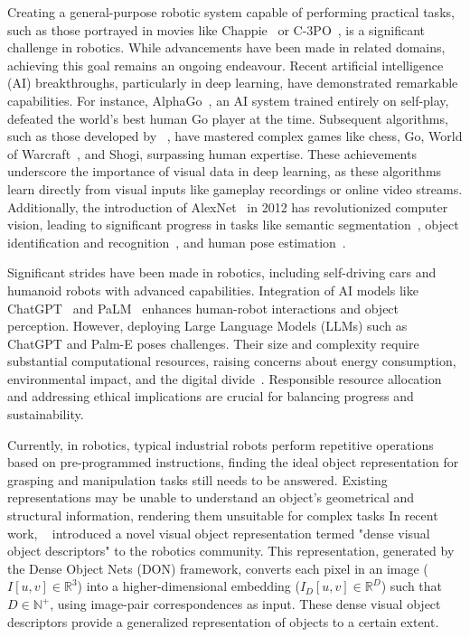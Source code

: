 Creating a general-purpose robotic system capable of performing practical tasks, such as those portrayed
in movies like Chappie~\cite{blomkamp2015chappie} or C-3PO~\cite{lucas1977star}, is a significant challenge in robotics.
While advancements have been made in related domains, achieving this goal remains an ongoing endeavour.
Recent artificial intelligence (AI) breakthroughs, particularly in deep learning, have demonstrated remarkable capabilities.
For instance, AlphaGo~\cite{silver2018general}, an AI system trained entirely on self-play, defeated the world's best human
Go player at the time. Subsequent algorithms, such as those developed by \citeauthor{silver2016mastering}~\cite{silver2016mastering},
have mastered complex games like chess, Go, World of Warcraft~\cite{entertainment2013world},
and Shogi, surpassing human expertise. These achievements underscore the importance of visual data in
deep learning, as these algorithms learn directly from visual inputs like gameplay recordings or online video streams.
Additionally, the introduction of AlexNet~\cite{krizhevsky2017imagenet} in 2012 has revolutionized computer vision,
leading to significant progress in tasks like semantic segmentation~\cite{long2015fully}, object identification
and recognition~\cite{he2017mask}, and human pose estimation~\cite{guler2018densepose}.

Significant strides have been made in robotics, including self-driving cars and humanoid robots with advanced capabilities.
Integration of AI models like ChatGPT~\cite{openai2023gpt4} and PaLM~\cite{palm}
enhances human-robot interactions and object perception. However, deploying Large Language Models (LLMs)
such as ChatGPT and Palm-E poses challenges.
Their size and complexity require substantial computational resources,
raising concerns about energy consumption, environmental impact,
and the digital divide~\cite{bender2021dangers,strubell2019energy}.
Responsible resource allocation and addressing ethical implications are crucial for balancing progress and sustainability.

Currently, in robotics, typical industrial robots perform repetitive operations based on pre-programmed instructions,
finding the ideal object representation for grasping and manipulation tasks still needs to be answered.
Existing representations may be unable to understand an object's geometrical and structural information, rendering them unsuitable for complex tasks
In recent work, \citeauthor{florence2018dense}~\cite{florence2018dense} introduced a novel visual object representation termed "dense visual object descriptors" to the robotics community.
This representation, generated by the Dense Object Nets (DON) framework, converts each pixel in an image ($I[u, v] \in \mathbb{R}^3$)
into a higher-dimensional embedding ($I_D[u, v] \in \mathbb{R}^D$) such that $D \in \mathbb{N}^+$,
using image-pair correspondences as input. These dense visual object descriptors provide a generalized representation of objects to a certain extent.


